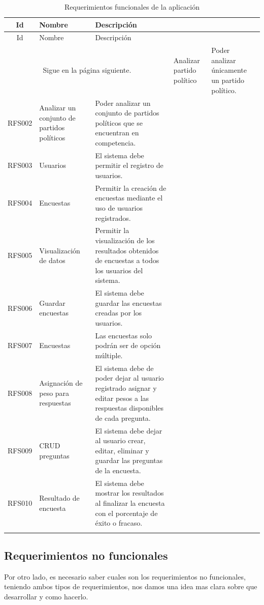 \begin{longtable}{|c|m{4cm}|m{9.5cm}|}
    \hline
    \rowcolor[HTML]{3531FF} 
    {\color[HTML]{FFFFFF} Id} &{\color[HTML]{FFFFFF}Nombre} & {\color[HTML]{FFFFFF} Descripción} \\ \hline
    \endfirsthead
    \hline
    \rowcolor[HTML]{3531FF} 
    {\color[HTML]{FFFFFF} Id} &{\color[HTML]{FFFFFF}Nombre} & {\color[HTML]{FFFFFF} Descripción} \\
    \hline 
    \endhead
    \multicolumn{3}{c}{Sigue en la página siguiente.}
    \endfoot
    \endlastfoot
    RFS001&Analizar partido político&Poder analizar únicamente un partido político.\\ \hline
    RFS002&Analizar un conjunto de partidos políticos&Poder analizar un conjunto de partidos políticos que se encuentran en competencia. \\ \hline
    RFS003&Usuarios&El sistema debe permitir el registro de usuarios. \\ \hline
    RFS004&Encuestas&Permitir la creación de encuestas mediante el uso de usuarios registrados. \\ \hline
    RFS005&Visualización de datos&Permitir la visualización de los resultados obtenidos de encuestas a todos los usuarios del sistema. \\ \hline
    RFS006&Guardar encuestas&El sistema debe guardar las encuestas creadas por los usuarios. \\\hline
    RFS007&Encuestas&Las encuestas solo podrán ser de opción múltiple. \\ \hline
    RFS008&Asignación de peso para respuestas&El sistema debe de poder dejar al usuario registrado asignar y editar pesos a las respuestas disponibles de cada pregunta. \\ \hline
    RFS009&CRUD preguntas&El sistema debe dejar al usuario crear, editar, eliminar y guardar las preguntas de la encuesta. \\ \hline
    RFS010&Resultado de encuesta&El sistema debe mostrar los resultados al finalizar la encuesta con el porcentaje de éxito o fracaso.\\ \hline
    \caption{Requerimientos funcionales de la aplicación}
    \label{table:RFS}
\end{longtable}
\subsection{Requerimientos no funcionales}
Por otro lado, es necesario saber cuales son los requerimientos no funcionales, teniendo ambos tipos de requerimientos, nos damos una idea mas clara sobre que desarrollar y como hacerlo.

